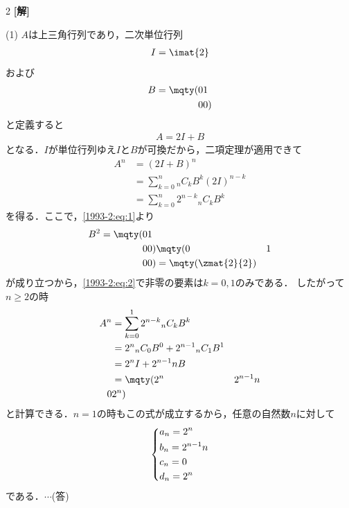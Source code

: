 \documentclass[../../main.tex]{subfiles}
\begin{document}
\setcounter{equation}{0}
\setcounter{figure}{0}
\setcounter{table}{0}
\begin{oframed}
  
\end{oframed}
\setlength{\columnseprule}{0.4pt}
\begin{multicols}{2}
  {\bf[解]}

  (1)
  $A$は上三角行列であり，二次単位行列
  \begin{align*}
    I = \imat{2}
  \end{align*}
  および
  \begin{align}
    B = \mqty(0 & 1 \\ 0 & 0 ) \label{1993-2:eq:1}
  \end{align}
  と定義すると
  \begin{align*}
    A = 2I + B
  \end{align*}
  となる．$I$が単位行列ゆえ$I$と$B$が可換だから，二項定理が適用できて
  \begin{align}
    A^n
     & = \left(2I+B\right)^{n}                                       \\
     & = \sum_{k=0}^{n} {}_{n}C_{k} B^{k}(2I)^{n-k}                  \\
     & = \sum_{k=0}^{n} 2^{n-k}{}_{n}C_{k} B^{k} \label{1993-2:eq:2}
  \end{align}
  を得る．ここで，\cref{1993-2:eq:1}より
  \begin{align*}
    B^{2} = \mqty(0 & 1 \\ 0 & 0 )\mqty(0 & 1 \\ 0 & 0 ) = \mqty(\zmat{2}{2})
  \end{align*}
  が成り立つから，\cref{1993-2:eq:2}で非零の要素は$k=0,1$のみである．
  したがって$n \ge 2$の時
  \begin{align*}
    A^{n}
      & = \sum_{k=0}^{1} 2^{n-k}{}_{n}C_{k} B^{k}                      \\
      & = 2^{n}{}_{n}C_{0} B^{0} + 2^{n-1}{}_{n}C_{1} B^{1}            \\
      & = 2^{n} I + 2^{n-1}n B                                         \\
      & = \mqty(2^{n}                                       & 2^{n-1}n \\
    0 & 2^{n})
  \end{align*}
  と計算できる．$n=1$の時もこの式が成立するから，任意の自然数$n$に対して
  \begin{align*}
    \begin{dcases}
      a_n = 2^{n}       \\
      b_n =    2^{n-1}n \\
      c_n = 0           \\
      d_n = 2^{n}
    \end{dcases}
  \end{align*}
  である．$\cdots$(答)


\end{multicols}
\end{document}
